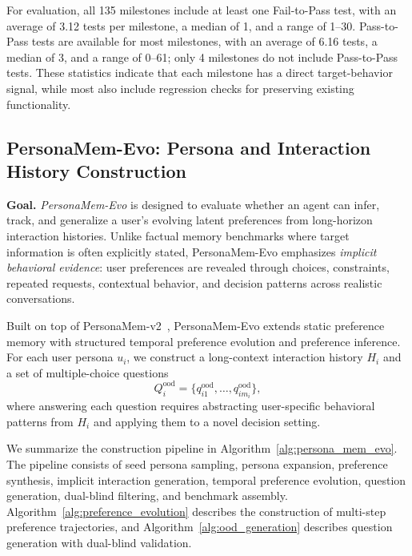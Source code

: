 \documentclass{article}
\begin{document}
For evaluation, all 135 milestones include at least one Fail-to-Pass test, with an average of 3.12 tests per milestone, a median of 1, and a range of 1--30. Pass-to-Pass tests are available for most milestones, with an average of 6.16 tests, a median of 3, and a range of 0--61; only 4 milestones do not include Pass-to-Pass tests. These statistics indicate that each milestone has a direct target-behavior signal, while most also include regression checks for preserving existing functionality.













\subsection{PersonaMem-Evo: Persona and Interaction History Construction}
\label{sec:persona_mem_evo_construction}
\label{app:persona_history}

\textbf{Goal.}
\emph{PersonaMem-Evo} is designed to evaluate whether an agent can infer, track, and generalize a user's evolving latent preferences from long-horizon interaction histories. Unlike factual memory benchmarks where target information is often explicitly stated, PersonaMem-Evo emphasizes \emph{implicit behavioral evidence}: user preferences are revealed through choices, constraints, repeated requests, contextual behavior, and decision patterns across realistic conversations.

Built on top of PersonaMem-v2~\cite{jiang2025personamem}, PersonaMem-Evo extends static preference memory with structured temporal preference evolution and preference inference. For each user persona $u_i$, we construct a long-context interaction history $H_i$ and a set of multiple-choice questions
\[
Q_i^{\mathrm{ood}} = \{q_{i1}^{\mathrm{ood}}, \ldots, q_{im_i}^{\mathrm{ood}}\},
\]
where answering each question requires abstracting user-specific behavioral patterns from $H_i$ and applying them to a novel decision setting.

We summarize the construction pipeline in Algorithm~\ref{alg:persona_mem_evo}. The pipeline consists of seed persona sampling, persona expansion, preference synthesis, implicit interaction generation, temporal preference evolution, question generation, dual-blind filtering, and benchmark assembly. Algorithm~\ref{alg:preference_evolution} describes the construction of multi-step preference trajectories, and Algorithm~\ref{alg:ood_generation} describes question generation with dual-blind validation.
\end{document}
